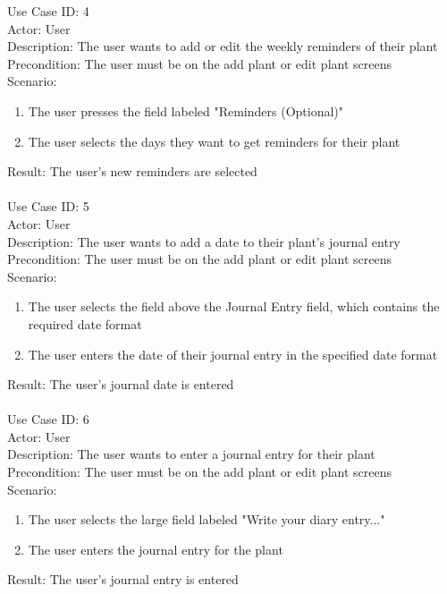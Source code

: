 \documentclass{sigchi}
\begin{document}
Use Case ID: 4 \\
Actor: User \\
Description: The user wants to add or edit the weekly reminders of their plant \\
Precondition: The user must be on the add plant or edit plant screens \\
Scenario: \begin{enumerate}
    \item The user presses the field labeled "Reminders (Optional)"
    \item The user selects the days they want to get reminders for their plant
\end{enumerate}
Result: The user's new reminders are selected \\
\\

Use Case ID: 5 \\
Actor: User \\
Description: The user wants to add a date to their plant's journal entry \\
Precondition: The user must be on the add plant or edit plant screens \\
Scenario: \begin{enumerate}
    \item The user selects the field above the Journal Entry field, which contains the required date format
    \item The user enters the date of their journal entry in the specified date format
\end{enumerate}
Result: The user's journal date is entered \\
\\

Use Case ID: 6 \\
Actor: User \\
Description: The user wants to enter a journal entry for their plant \\
Precondition: The user must be on the add plant or edit plant screens \\
Scenario: \begin{enumerate}
    \item The user selects the large field labeled "Write your diary entry..."
    \item The user enters the journal entry for the plant
\end{enumerate}
Result: The user's journal entry is entered \\
\\
\end{document}
